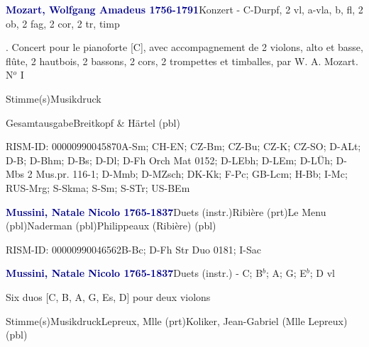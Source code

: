 \documentclass[twocolumn, 12pt]{book}
\begin{document}
\par \vspace{16pt} \textcolor{darkblue}{\textbf{Mozart, Wolfgang Amadeus  1756-1791}}\hfillplus{\textbf{[304]}}\newline Konzert - C-Dur\newline pf, 2 vl, a-vla, b, fl, 2 ob, 2 fag, 2 cor, 2 tr, timp
\par \begin{itshape}. Concert pour le pianoforte [C], avec accompagnement de 2 violons, alto et basse, flûte, 2 hautbois, 2 bassons, 2 cors, 2 trompettes et timballes, par W. A. Mozart. N$^o$ I\end{itshape} 
\par \textcolor{darkblue}{}  Stimme(s)\newline Musikdruck
\par Gesamtausgabe\newline Breitkopf \& Härtel  (pbl)
\par RISM-ID: 00000990045870\newline A-Sm; CH-EN; CZ-Bm; CZ-Bu; CZ-K; CZ-SO; D-ALt; D-B; D-Bhm; D-Bs; D-Dl; D-Fh  Orch Mat 0152; D-LEbh; D-LEm; D-LÜh; D-Mbs  2 Mus.pr. 116-1; D-Mmb; D-MZsch; DK-Kk; F-Pc; GB-Lcm; H-Bb; I-Mc; RUS-Mrg; S-Skma; S-Sm; S-STr; US-BEm
\par \vspace{16pt} \textcolor{darkblue}{\textbf{Mussini, Natale Nicolo  1765-1837}}\hfillplus{\textbf{[305]}}\newline Duets (instr.)\newline Ribière  (prt)\newline Le Menu  (pbl)\newline Naderman  (pbl)\newline Philippeaux (Ribière)  (pbl)
\par RISM-ID: 00000990046562\newline B-Bc; D-Fh  Str Duo 0181; I-Sac
\par \vspace{16pt} \textcolor{darkblue}{\textbf{Mussini, Natale Nicolo  1765-1837}}\hfillplus{\textbf{[306]}}\newline Duets (instr.) - C; B$^b$; A; G; E$^b$; D vl
\par \begin{itshape}Six duos [C, B, A, G, Es, D] pour deux violons\end{itshape} 
\par \textcolor{darkblue}{}  Stimme(s)\newline Musikdruck\newline Lepreux, Mlle  (prt)\newline Koliker, Jean-Gabriel (Mlle Lepreux)  (pbl)
\end{document}
